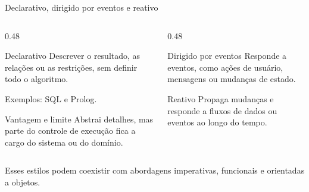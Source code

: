 \documentclass[aspectratio=169,10pt]{beamer}
\begin{document}
\begin{frame}{Declarativo, dirigido por eventos e reativo}
  \begin{columns}[T,onlytextwidth]
    \begin{column}{0.48\textwidth}
      \begin{block}{Declarativo}
        Descrever o resultado, as relações ou as restrições, sem definir todo o algoritmo.\par\small Exemplos: SQL e Prolog.
      \end{block}
      \begin{exampleblock}{Vantagem e limite}
        Abstrai detalhes, mas parte do controle de execução fica a cargo do sistema ou do domínio.
      \end{exampleblock}
    \end{column}
    \begin{column}{0.48\textwidth}
      \begin{block}{Dirigido por eventos}
        Responde a eventos, como ações de usuário, mensagens ou mudanças de estado.
      \end{block}
      \begin{exampleblock}{Reativo}
        Propaga mudanças e responde a fluxos de dados ou eventos ao longo do tempo.
      \end{exampleblock}
    \end{column}
  \end{columns}
  \vspace{0.5em}
  \centering\small Esses estilos podem coexistir com abordagens imperativas, funcionais e orientadas a objetos.
\end{frame}
\end{document}
